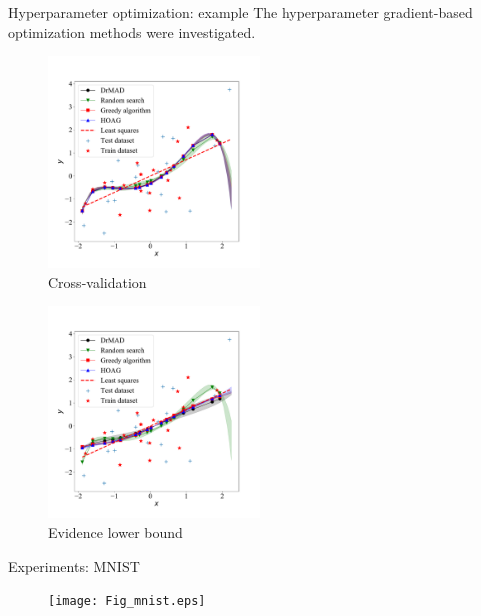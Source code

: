 \documentclass[usenames,dvipsnames,11pt,pdf,utf8,russian,aspectratio=43]{beamer}
\begin{document}
\begin{frame}{Hyperparameter optimization: example}
The hyperparameter gradient-based optimization methods were investigated.\\

\begin{multicols}{2}

\begin{figure}[h]
\hspace*{-1cm}
\includegraphics[width=0.5\textwidth]{./slide_plots/Fig_poly_cv2.pdf}
\caption*{Cross-validation}
\end{figure}

\begin{figure}[h]
\hspace*{-1cm}
\includegraphics[width=0.5\textwidth]{./slide_plots/Fig_poly_var2.pdf}
\caption*{Evidence lower bound}
\end{figure}
\end{multicols}

\end{frame}


\begin{frame}{Experiments: MNIST}
\begin{figure}  
\texttt{[image: Fig\_mnist.eps]}
\end{figure}
\end{frame}
\end{document}
